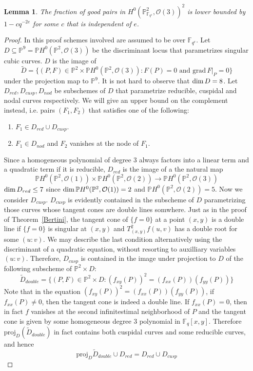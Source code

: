 \documentclass[12pt]{article}
\theoremstyle{plain}
\newtheorem{lemma}[equation]{Lemma}
\theoremstyle{definition}
\newcommand{\IF}{\mathbb{F}}
\newcommand{\IP}{\mathbb{P}}
\newcommand{\sO}{\mathcal{O}}
\renewcommand\dim{{\rm dim\,}}
\newcommand{\<}{\langle}
\renewcommand{\>}{\rangle}
\def\wt{\widetilde}
\newcommand{\grad}{\mathrm{grad}\,}
\newcommand{\proj}{\mathrm{proj}}
\begin{document}
\begin{lemma}
\label{pcount}
The fraction of good pairs in $H^0(\IP^2_{\IF_{q^e}}, \sO(3))^2$ is lower bounded by $1 - c q^{-2e}$ for some $c$ that is independent of $e$. 
\end{lemma}
\begin{proof}
In this proof schemes involved are assumed to be over $\IF_{q^e}$. Let $D \subseteq \IP^9 = \IP H^0(\IP^2, \sO(3))$ be the discriminant locus that parametrizes singular cubic curves. $D$ is the image of 
$$ \wt{D} = \{ (P, F) \in \IP^2 \times \IP H^0(\IP^2, \sO(3)) : F(P) =0 \text{ and } \grad F|_P = 0 \}$$ under the projection map to $\IP^9$. It is not hard to observe that $\dim D = 8$. Let $D_{red}, D_{cusp}, D_{nod}$ be subschemes of $D$ that parametrize reducible, cuspidal and nodal curves respectively. We will give an upper bound on the complement instead, i.e. pairs $(F_1, F_2)$ that satisfies one of the following:
\begin{enumerate}
\item $F_1 \in D_{red} \cup D_{cusp}$.
\item $F_1 \in D_{nod}$ and $F_2$ vanishes at the node of $F_1$.
\end{enumerate}
Since a homogeneous polynomial of degree $3$ always factors into a linear term and a quadratic term if it is reducible, $D_{red}$ is the image of a the natural map 
$$ \IP H^0(\IP^2, \sO(1)) \times \IP H^0(\IP^2, \sO(2)) \to \IP H^0(\IP^2, \sO(3))$$
$\dim D_{red} \le 7$ since $\dim \IP H^0(\IP^2, \sO(1)) = 2$ and $\IP H^0(\IP^2, \sO(2)) = 5$. Now we consider $D_{cusp}$. $D_{cusp}$ is evidently contained in the subscheme of $D$ parametrizing those curves whose tangent cones are double lines somwhere. Just as in the proof of Theorem~\ref{Bertini}, the tangent cone of $\{f=0\}$ at a point $(x, y)$ is a double line if $\{f=0\}$ is singular at $(x, y)$ and $T^2_{(x, y)}f(u, v)$ has a double root for some $(u : v)$. We may describe the last condition alternatively using the discriminant of a quadratic equation, without resorting to auxilliary variables $(u : v)$. Therefore, $D_{cusp}$ is contained in the image under projection to $D$ of the following subscheme of $\IP^2 \times  D $:
$$ \wt{D}_{double} = \{ (P, F) \in \IP^2 \times D : (f_{xy}(P))^2 = (f_{xx}(P))(f_{yy}(P))\} $$
Note that in the equation $(f_{xy}(P))^2 = (f_{xx}(P))(f_{yy}(P))$, if $f_{xx}(P) \neq 0$, then the tangent cone is indeed a double line. If $f_{xx}(P) = 0$, then in fact $f$ vanishes at the second infinitestimal neighborhood of $P$ and the tangent cone is given by some homogeneous degree $3$ polynomial in $\IF_q[x, y]$. Therefore $\proj_D(\wt{D}_{double})$ in fact contains both cuspidal curves and some reducible curves, and hence $$\proj_D{\wt{D}_{double}} \cup D_{red} = D_{red} \cup D_{cusp}$$

\end{proof}
\end{document}
